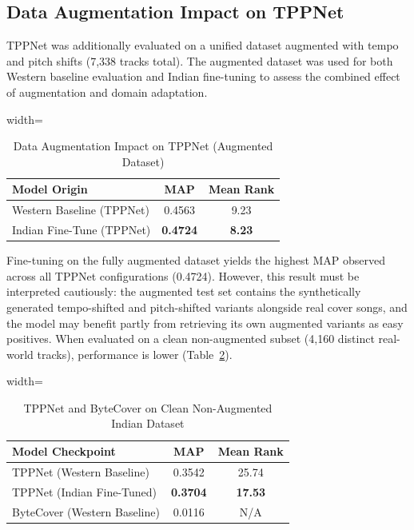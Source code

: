 \documentclass[conference]{IEEEtran}
\begin{document}
\subsection{Data Augmentation Impact on TPPNet}

TPPNet was additionally evaluated on a unified dataset augmented with tempo and pitch shifts (7,338 tracks total). The augmented dataset was used for both Western baseline evaluation and Indian fine-tuning to assess the combined effect of augmentation and domain adaptation.

\begin{table}[htbp]
    \caption{Data Augmentation Impact on TPPNet (Augmented Dataset)}
    \label{tab:tppnet_aug}
    \centering
    \begin{adjustbox}{width=\columnwidth}
    \begin{tabular}{lcc}
    \toprule
    \textbf{Model Origin} & \textbf{MAP} & \textbf{Mean Rank} \\
    \midrule
    Western Baseline (TPPNet) & 0.4563 & 9.23 \\
    Indian Fine-Tune (TPPNet) & \textbf{0.4724} & \textbf{8.23} \\
    \bottomrule
    \end{tabular}
    \end{adjustbox}
\end{table}

Fine-tuning on the fully augmented dataset yields the highest MAP observed across all TPPNet configurations (0.4724). However, this result must be interpreted cautiously: the augmented test set contains the synthetically generated tempo-shifted and pitch-shifted variants alongside real cover songs, and the model may benefit partly from retrieving its own augmented variants as easy positives. When evaluated on a clean non-augmented subset (4,160 distinct real-world tracks), performance is lower (Table~\ref{tab:tppnet_clean}).

\begin{table}[htbp]
    \caption{TPPNet and ByteCover on Clean Non-Augmented Indian Dataset}
    \label{tab:tppnet_clean}
    \centering
    \begin{adjustbox}{width=\columnwidth}
    \begin{tabular}{lcc}
    \toprule
    \textbf{Model Checkpoint} & \textbf{MAP} & \textbf{Mean Rank} \\
    \midrule
    TPPNet (Western Baseline)    & 0.3542 & 25.74 \\
    TPPNet (Indian Fine-Tuned)   & \textbf{0.3704} & \textbf{17.53} \\
    ByteCover (Western Baseline) & 0.0116 & N/A \\
    \bottomrule
    \end{tabular}
    \end{adjustbox}
\end{table}
\end{document}
